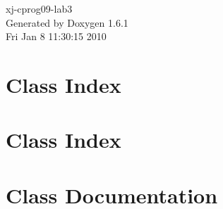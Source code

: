 \documentclass[a4paper]{book}
\begin{document}
\hypersetup{pageanchor=false}
\begin{titlepage}
\vspace*{7cm}
\begin{center}
{\Large xj-\/cprog09-\/lab3 }\\
\vspace*{1cm}
{\large Generated by Doxygen 1.6.1}\\
\vspace*{0.5cm}
{\small Fri Jan 8 11:30:15 2010}\\
\end{center}
\end{titlepage}
\clearemptydoublepage
{}
\tableofcontents
\clearemptydoublepage
{}
\hypersetup{pageanchor=true}
\chapter{Class Index}

\chapter{Class Index}

\chapter{Class Documentation}

























\printindex
\end{document}
